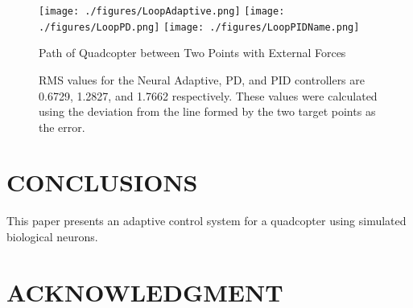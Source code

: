 \documentclass[letterpaper, 10 pt, conference]{ieeeconf}  %
\begin{document}
\begin{figure}
\centering
\texttt{[image: ./figures/LoopAdaptive.png]}
\texttt{[image: ./figures/LoopPD.png]}
\texttt{[image: ./figures/LoopPIDName.png]}
\caption{Path of Quadcopter between Two Points with External Forces} %
\label{fig:loop_path}
\captionsetup{singlelinecheck=off,font=footnotesize}
\caption*{
RMS values for the Neural Adaptive, PD, and PID controllers are 0.6729, 1.2827, and 1.7662 respectively. These values were calculated using the deviation from the line formed by the two target points as the error.}
\end{figure}

\section{CONCLUSIONS}

This paper presents an adaptive control system for a quadcopter using simulated biological neurons.


\addtolength{\textheight}{-12cm}   %






\section*{ACKNOWLEDGMENT}








\nocite{*}
\end{document}

